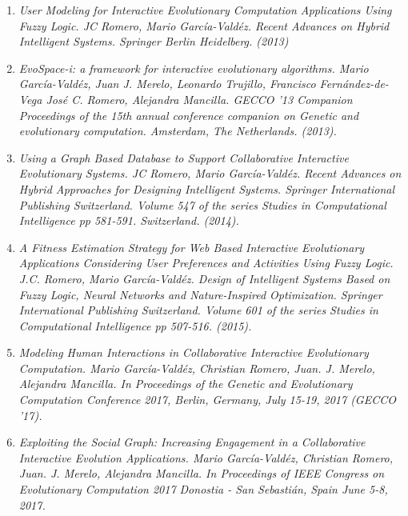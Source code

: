 
\begin{enumerate}
\item \textit{User Modeling for Interactive Evolutionary Computation
Applications Using Fuzzy Logic. JC Romero, Mario Garc\'ia-Vald\'ez.
 Recent Advances on Hybrid Intelligent Systems. Springer Berlin Heidelberg. (2013)}
\item \textit{ EvoSpace-i: a framework for interactive evolutionary algorithms.
Mario Garc\'ia-Vald\'ez, 	Juan J. Merelo, 	Leonardo Trujillo, 	Francisco
Fernández-de-Vega Jos\'e C. Romero, 	Alejandra Mancilla. GECCO '13 Companion
Proceedings of the 15th annual conference  companion on Genetic and evolutionary
computation. Amsterdam, The Netherlands. (2013).}
\item \textit{Using a Graph Based Database to Support Collaborative Interactive
Evolutionary Systems.  JC Romero, Mario Garc\'ia-Vald\'ez. Recent Advances on
Hybrid Approaches for Designing Intelligent Systems. Springer International
Publishing Switzerland. Volume 547 of the series Studies in Computational
Intelligence pp 581-591. Switzerland. (2014).}
\item \textit{A Fitness Estimation Strategy for Web Based Interactive Evolutionary
Applications Considering User Preferences and Activities Using Fuzzy Logic. J.C.
Romero, Mario Garc\'ia-Vald\'ez. Design of Intelligent Systems Based on Fuzzy
Logic, Neural Networks and Nature-Inspired Optimization. Springer International
Publishing Switzerland. Volume 601 of the series Studies in Computational
Intelligence pp 507-516. (2015).}
\item \textit{Modeling Human Interactions in
Collaborative Interactive Evolutionary Computation.  Mario Garc\'ia-Vald\'ez,
Christian Romero, Juan. J. Merelo, Alejandra Mancilla.  In Proceedings of the Genetic and Evolutionary Computation
Conference 2017, Berlin, Germany, July 15-19, 2017 (GECCO ’17).}
\item \textit{Exploiting the Social Graph: Increasing Engagement in a Collaborative Interactive Evolution Applications.
Mario Garc\'ia-Vald\'ez,
Christian Romero, Juan. J. Merelo, Alejandra Mancilla.  In Proceedings of IEEE Congress on Evolutionary Computation 2017
Donostia - San Sebastián, Spain
June 5-8, 2017.}
\end{enumerate}
